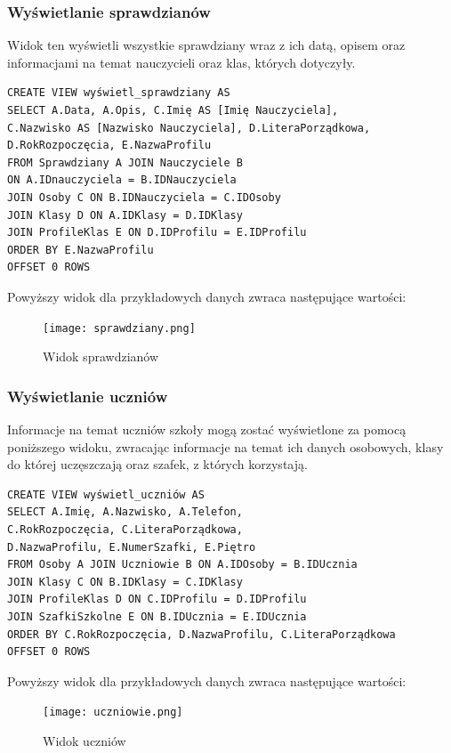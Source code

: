 \documentclass[60pt]{article}
\begin{document}
\subsubsection{Wyświetlanie sprawdzianów}

Widok ten wyświetli wszystkie sprawdziany wraz z ich datą, opisem oraz informacjami na temat nauczycieli oraz klas, których dotyczyły.

\begin{verbatim}
CREATE VIEW wyświetl_sprawdziany AS
SELECT A.Data, A.Opis, C.Imię AS [Imię Nauczyciela], 
C.Nazwisko AS [Nazwisko Nauczyciela], D.LiteraPorządkowa, D.RokRozpoczęcia, E.NazwaProfilu
FROM Sprawdziany A JOIN Nauczyciele B
ON A.IDnauczyciela = B.IDNauczyciela
JOIN Osoby C ON B.IDNauczyciela = C.IDOsoby
JOIN Klasy D ON A.IDKlasy = D.IDKlasy
JOIN ProfileKlas E ON D.IDProfilu = E.IDProfilu
ORDER BY E.NazwaProfilu
OFFSET 0 ROWS
\end{verbatim}

Powyższy widok dla przykładowych danych zwraca następujące wartości:

\begin{figure}[h]
  \texttt{[image: sprawdziany.png]}
  \caption{Widok sprawdzianów}
  \label{Widok sprawdzianów}
\end{figure}

\subsubsection{Wyświetlanie uczniów}

Informacje na temat uczniów szkoły mogą zostać wyświetlone za pomocą poniższego widoku, zwracając informacje na temat ich danych osobowych, klasy do której uczęszczają oraz szafek, z których korzystają.

\begin{verbatim}
CREATE VIEW wyświetl_uczniów AS
SELECT A.Imię, A.Nazwisko, A.Telefon, 
C.RokRozpoczęcia, C.LiteraPorządkowa, 
D.NazwaProfilu, E.NumerSzafki, E.Piętro
FROM Osoby A JOIN Uczniowie B ON A.IDOsoby = B.IDUcznia
JOIN Klasy C ON B.IDKlasy = C.IDKlasy
JOIN ProfileKlas D ON C.IDProfilu = D.IDProfilu
JOIN SzafkiSzkolne E ON B.IDUcznia = E.IDUcznia
ORDER BY C.RokRozpoczęcia, D.NazwaProfilu, C.LiteraPorządkowa
OFFSET 0 ROWS
\end{verbatim}

Powyższy widok dla przykładowych danych zwraca następujące wartości:

\begin{figure}[h]
  \texttt{[image: uczniowie.png]}
  \caption{Widok uczniów}
  \label{Widok uczniów}
\end{figure}
\end{document}
